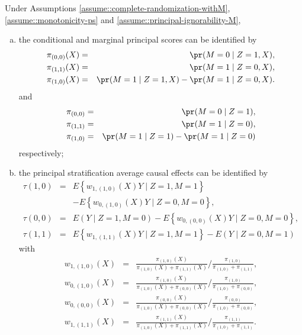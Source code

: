 \begin{theorem}
\label{thm::identification-PCEs-pscore-general-ding-lu}
Under Assumptions \ref{assume::complete-randomization-withM}, \ref{assume::monotonicity-ps} and \ref{assume::principal-ignorability-M}, 
\begin{enumerate}
[(a)]
\item
 the conditional and marginal principal scores can be identified by
\begin{eqnarray*}
\pi_{(0,0)}(X) &=& \pr(M=0\mid Z=1, X),\\
\pi_{(1,1)}(X) &=& \pr(M=1\mid Z=0, X),\\
\pi_{(1,0)}(X) &=& \pr(M=1\mid Z=1, X) - \pr(M=1\mid Z=0, X).
\end{eqnarray*}
and
\begin{eqnarray*}
\pi_{(0,0)} &=& \pr(M=0\mid Z=1),\\
\pi_{(1,1)} &=& \pr(M=1\mid Z=0),\\
\pi_{(1,0)} &=& \pr(M=1\mid Z=1) - \pr(M=1\mid Z=0)
\end{eqnarray*}
respectively;
\item
the principal  stratification average causal effects can be identified by 
\begin{eqnarray*}
\tau(1,0) &=& E\left\{w_{1, (1,0)}(X) Y \mid Z=1, M=1\right\}  \\
&& -E\left\{w_{0, (1,0)}(X) Y \mid Z=0, M=0\right\} , \\
\tau(0,0) &=& E(Y \mid Z=1, M=0)-E\left\{w_{0, (0,0)}( X ) Y \mid Z=0, M=0\right\}, \\
\tau(1,1) &=& E\left\{w_{1,  (1,1)}( X ) Y \mid Z=1, M=1\right\}-E(Y \mid Z=0, M=1)
\end{eqnarray*}
with 
\begin{eqnarray*}
w_{1, (1,0)}(X) &=&\frac{\pi_{(1,0)}(X)}{\pi_{(1,0)}(X)+\pi_{(1,1)}(X)} \Big / \frac{\pi_{(1,0)}}{\pi_{(1,0)}+\pi_{(1,1)}} , \\
w_{0, (1,0)}(X) &=& \frac{\pi_{(1,0)}(X)}{\pi_{(1,0)}(X)+\pi_{(0,0)}(X)} \Big / \frac{\pi_{(1,0)}}{\pi_{(1,0)}+\pi_{(0,0)}} ,  \\
w_{0, (0,0)}(X) &=&\frac{\pi_{(0,0)}(X)}{\pi_{(1,0)}(X)+\pi_{(0,0)}(X)} \Big / \frac{\pi_{(0,0)}}{\pi_{(1,0)}+\pi_{(0,0)}} , \\
w_{1, (1,1)}(X) &=&\frac{\pi_{(1,1)}(X)}{\pi_{(1,0)}(X)+\pi_{(1,1)}(X)} \Big / \frac{\pi_{(1,1)}}{\pi_{(1,0)}+\pi_{(1,1)}} .
\end{eqnarray*}
\end{enumerate}
\end{theorem}



